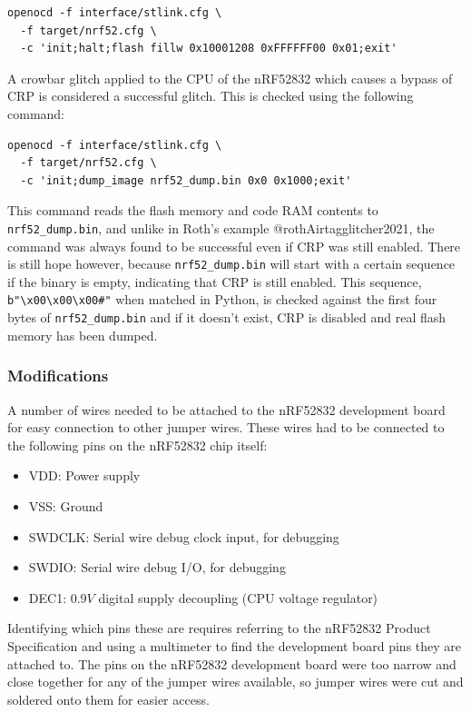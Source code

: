 \begin{verbatim}
openocd -f interface/stlink.cfg \
  -f target/nrf52.cfg \
  -c 'init;halt;flash fillw 0x10001208 0xFFFFFF00 0x01;exit'
\end{verbatim}

A crowbar glitch applied to the CPU of the nRF52832 which causes a
bypass of CRP is considered a successful glitch. This is checked using
the following command:

\begin{verbatim}
openocd -f interface/stlink.cfg \
  -f target/nrf52.cfg \
  -c 'init;dump_image nrf52_dump.bin 0x0 0x1000;exit'
\end{verbatim}

This command reads the flash memory and code RAM contents to
\texttt{nrf52\_dump.bin}, and unlike in Roth's example
@rothAirtagglitcher2021, the command was always found to be successful
even if CRP was still enabled. There is still hope however, because
\texttt{nrf52\_dump.bin} will start with a certain sequence if the
binary is empty, indicating that CRP is still enabled. This sequence,
\texttt{b"\textbackslash{}x00\textbackslash{}x00\textbackslash{}x00\#"}
when matched in Python, is checked against the first four bytes of
\texttt{nrf52\_dump.bin} and if it doesn't exist, CRP is disabled and
real flash memory has been dumped.

\hypertarget{modifications}{%
\subsubsection{Modifications}\label{modifications}}

A number of wires needed to be attached to the nRF52832 development
board for easy connection to other jumper wires. These wires had to be
connected to the following pins on the nRF52832 chip itself:

\begin{itemize}
\tightlist
\item
  VDD: Power supply
\item
  VSS: Ground
\item
  SWDCLK: Serial wire debug clock input, for debugging
\item
  SWDIO: Serial wire debug I/O, for debugging
\item
  DEC1: \(0.9V\) digital supply decoupling (CPU voltage regulator)
\end{itemize}

Identifying which pins these are requires referring to the nRF52832
Product Specification and using a multimeter to find the development
board pins they are attached to. The pins on the nRF52832 development
board were too narrow and close together for any of the jumper wires
available, so jumper wires were cut and soldered onto them for easier
access.

